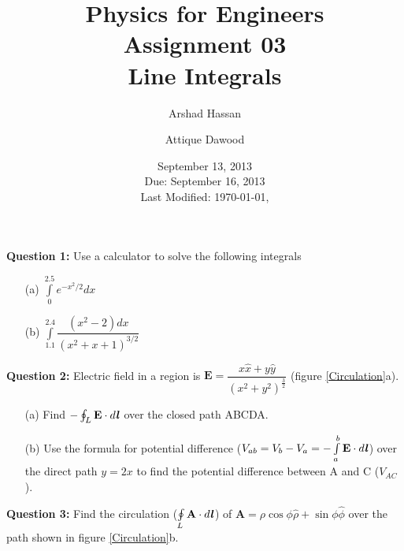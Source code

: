 \documentclass[12pt,a4paper]{article}
\title{\vspace{-4cm}Physics for Engineers\\Assignment 03\\Line Integrals}
\author{Arshad Hassan\and Attique Dawood}
\date{September 13, 2013\\Due: September 16, 2013\\[0.2cm] Last Modified: \today, \currenttime}
\begin{document}
\maketitle
\noindent\textbf{Question 1:} Use a calculator to solve the following integrals
\begin{itemize}
\item[(a)] $\int\limits_{0}^{2.5}e^{-x^2/2}dx$
\item[(b)] $\int\limits_{1.1}^{2.4}\dfrac{(x^2-2)dx}{(x^2+x+1)^{3/2}}$
\end{itemize}
\noindent\textbf{Question 2:} Electric field in a region is $\textbf{E}=\dfrac{x\hat x+y\hat y}{(x^2+y^2)^\frac{3}{2}}$ (figure \ref{Circulation}a).
\begin{itemize}
\item[(a)] Find $-\oint_L \textbf{E}\cdot d\textbf{\textit{l}}$ over the closed path ABCDA.
\item[(b)] Use the formula for potential difference ($V_{ab}=V_b-V_a=-\int\limits_{a}^{b}\textbf{E}\cdot d\textbf{\textit{l}}$) over the direct path $y=2x$ to find the potential difference between A and C ($V_{AC}$).
\end{itemize}
\noindent\textbf{Question 3:} Find the circulation ($\oint\limits_{L} \textbf{A}\cdot d\textbf{\textit{l}}$) of $\textbf{A}=\rho \cos\phi\hat \rho+\sin\phi\hat\phi$ over the path shown in figure \ref{Circulation}b.\\[0.2cm]
\end{document}
